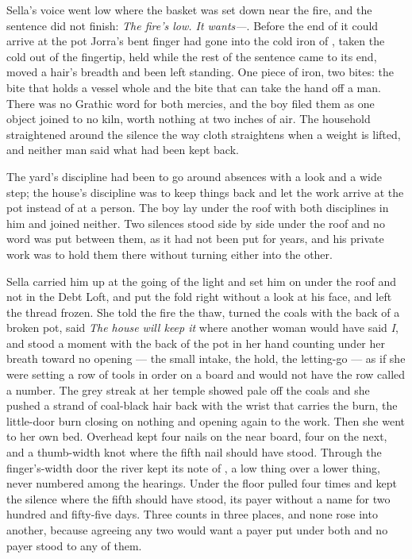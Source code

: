 Sella's voice went low where the basket was set down near the fire, and the sentence did not finish: \emph{The fire's low. It wants---}. Before the end of it could arrive at the pot Jorra's bent finger had gone into the cold iron of , taken the cold out of the fingertip, held while the rest of the sentence came to its end, moved a hair's breadth and been left standing. One piece of iron, two bites: the bite that holds a vessel whole and the bite that can take the hand off a man. There was no Grathic word for both mercies, and the boy filed them as one object joined to no kiln, worth nothing at two inches of air. The household straightened around the silence the way cloth straightens when a weight is lifted, and neither man said what had been kept back.

The yard's discipline had been to go around absences with a look and a wide step; the house's discipline was to keep things back and let the work arrive at the pot instead of at a person. The boy lay under the roof with both disciplines in him and joined neither. Two silences stood side by side under the roof and no word was put between them, as it had not been put for years, and his private work was to hold them there without turning either into the other.

\scenebreak

Sella carried him up  at the going of the light and set him on  under the roof and not in the Debt Loft, and put the fold right without a look at his face, and left the thread frozen. She told the fire the thaw, turned the coals with the back of a broken pot, said \emph{The house will keep it} where another woman would have said \emph{I}, and stood a moment with the back of the pot in her hand counting under her breath toward no opening --- the small intake, the hold, the letting-go --- as if she were setting a row of tools in order on a board and would not have the row called a number. The grey streak at her temple showed pale off the coals and she pushed a strand of coal-black hair back with the wrist that carries the burn, the little-door burn closing on nothing and opening again to the work. Then she went to her own bed. Overhead  kept four nails on the near board, four on the next, and a thumb-width knot where the fifth nail should have stood. Through the finger's-width door the river kept its note of , a low thing over a lower thing, never numbered among the hearings. Under the floor  pulled four times and kept the silence where the fifth should have stood, its payer without a name for two hundred and fifty-five days. Three counts in three places, and none rose into another, because agreeing any two would want a payer put under both and no payer stood to any of them.

